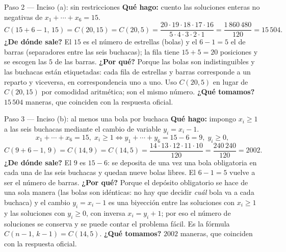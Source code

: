 \documentclass[11pt]{article}
\begin{document}
\begin{paso}{Paso 2 --- Inciso (a): sin restricciones}
\textbf{Qué hago:} cuento las soluciones enteras no negativas de $x_1+\cdots+x_6=15$.
\[
C(15+6-1,\,15)=C(20,15)=C(20,5)=\frac{20\cdot19\cdot18\cdot17\cdot16}{5\cdot4\cdot3\cdot2\cdot1}=\frac{1\,860\,480}{120}=15\,504 .
\]
\textbf{¿De dónde sale?} El $15$ es el número de estrellas (bolas) y el $6-1=5$ el de barras (separadores entre las seis buchacas); la fila tiene $15+5=20$ posiciones y se escogen las $5$ de las barras.
\textbf{¿Por qué?} Porque las bolas son indistinguibles y las buchacas están etiquetadas: cada fila de estrellas y barras corresponde a un reparto y viceversa, en correspondencia uno a uno. Uso $C(20,5)$ en lugar de $C(20,15)$ por comodidad aritmética; son el mismo número.
\textbf{¿Qué tomamos?} $15\,504$ maneras, que coinciden con la respuesta oficial.
\end{paso}

\begin{paso}{Paso 3 --- Inciso (b): al menos una bola por buchaca}
\textbf{Qué hago:} impongo $x_i\ge1$ a las seis buchacas mediante el cambio de variable $y_i=x_i-1$.
\[
x_1+\cdots+x_6=15,\;x_i\ge1\iff y_1+\cdots+y_6=15-6=9,\;y_i\ge0,
\]
\[
C(9+6-1,\,9)=C(14,9)=C(14,5)=\frac{14\cdot13\cdot12\cdot11\cdot10}{120}=\frac{240\,240}{120}=2002 .
\]
\textbf{¿De dónde sale?} El $9$ es $15-6$: se deposita de una vez una bola obligatoria en cada una de las seis buchacas y quedan nueve bolas libres. El $6-1=5$ vuelve a ser el número de barras.
\textbf{¿Por qué?} Porque el depósito obligatorio se hace de una sola manera (las bolas son idénticas: no hay que decidir \emph{cuál} bola va a cada buchaca) y el cambio $y_i=x_i-1$ es una biyección entre las soluciones con $x_i\ge1$ y las soluciones con $y_i\ge0$, con inversa $x_i=y_i+1$; por eso el número de soluciones se conserva y se puede contar el problema fácil. Es la fórmula $C(n-1,\,k-1)=C(14,5)$.
\textbf{¿Qué tomamos?} $2002$ maneras, que coinciden con la respuesta oficial.
\end{paso}
\end{document}
